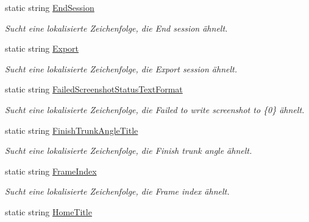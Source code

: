 \begin{DoxyCompactItemize}
static string \hyperlink{class_rowing_monitor_1_1_properties_1_1_resources_ae9040fc326480ec6679211524c8aef3b}{End\+Session}
\begin{DoxyCompactList}\small\item\em Sucht eine lokalisierte Zeichenfolge, die End session ähnelt. \end{DoxyCompactList}\item 
static string \hyperlink{class_rowing_monitor_1_1_properties_1_1_resources_aa4ad4cd82d6f6b3289cc385c3551d85f}{Export}
\begin{DoxyCompactList}\small\item\em Sucht eine lokalisierte Zeichenfolge, die Export session ähnelt. \end{DoxyCompactList}\item 
static string \hyperlink{class_rowing_monitor_1_1_properties_1_1_resources_a82fbb12913d48de07a02c10dd756b575}{Failed\+Screenshot\+Status\+Text\+Format}
\begin{DoxyCompactList}\small\item\em Sucht eine lokalisierte Zeichenfolge, die Failed to write screenshot to \{0\} ähnelt. \end{DoxyCompactList}\item 
static string \hyperlink{class_rowing_monitor_1_1_properties_1_1_resources_acd7d5d6ec683cf057f592a4376863aaf}{Finish\+Trunk\+Angle\+Title}
\begin{DoxyCompactList}\small\item\em Sucht eine lokalisierte Zeichenfolge, die Finish trunk angle ähnelt. \end{DoxyCompactList}\item 
static string \hyperlink{class_rowing_monitor_1_1_properties_1_1_resources_a63d3b05296e1f16c61a2b7a9d1b3b651}{Frame\+Index}
\begin{DoxyCompactList}\small\item\em Sucht eine lokalisierte Zeichenfolge, die Frame index ähnelt. \end{DoxyCompactList}\item 
static string \hyperlink{class_rowing_monitor_1_1_properties_1_1_resources_af4884ca8ac262911b1fc76c39483a14a}{Home\+Title}

\end{DoxyCompactItemize}
